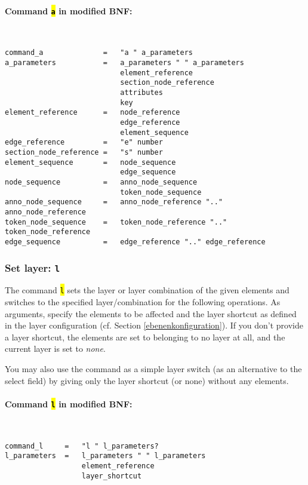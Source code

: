 \documentclass[12pt]{scrartcl}
\newcommand{\code}[1]{\hl{\texttt{#1}}}
\begin{document}
\paragraph*{Command \code{a} in modified BNF:}
~
\begin{lstlisting}
command_a              =   "a " a_parameters
a_parameters           =   a_parameters " " a_parameters
                           element_reference
                           section_node_reference
                           attributes
                           key
element_reference      =   node_reference
                           edge_reference
                           element_sequence
edge_reference         =   "e" number
section_node_reference =   "s" number
element_sequence       =   node_sequence
                           edge_sequence
node_sequence          =   anno_node_sequence
                           token_node_sequence
anno_node_sequence     =   anno_node_reference ".." anno_node_reference
token_node_sequence    =   token_node_reference ".." token_node_reference
edge_sequence          =   edge_reference ".." edge_reference
\end{lstlisting}


\subsubsection{Set layer: \texttt{l}}\label{befehl-l}

The command \code{l} sets the layer or layer combination of the given elements and switches to the specified layer/combination for the following operations.
As arguments, specify the elements to be affected and the layer shortcut as defined in the layer configuration (cf. Section \ref{ebenenkonfiguration}).
If you don’t provide a layer shortcut, the elements are set to belonging to no layer at all, and the current layer is set to \textit{none}.

You may also use the command as a simple layer switch (as an alternative to the select field) by giving only the layer shortcut (or none) without any elements.

\paragraph*{Command \code{l} in modified BNF:}
~
\begin{lstlisting}
command_l     =   "l " l_parameters?
l_parameters  =   l_parameters " " l_parameters
                  element_reference
                  layer_shortcut
\end{lstlisting}
\end{document}

